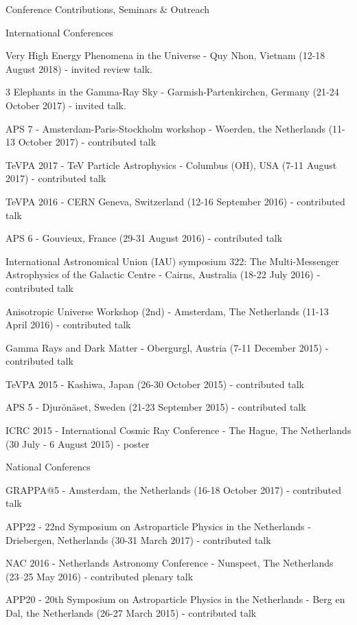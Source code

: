 \begin{rSection}{Conference Contributions, Seminars \& Outreach}
\begin{rSubsection}{International Conferences}{}{}{}
\vspace{-1.5em}
    \item Very High Energy Phenomena in the Universe - Quy Nhon, Vietnam (12-18 August 2018) - invited review talk.
    \item 3 Elephants in the Gamma-Ray Sky - Garmish-Partenkirchen, Germany (21-24 October 2017) - invited talk.
    \item APS 7 - Amsterdam-Paris-Stockholm workshop - Woerden, the Netherlands (11-13 October 2017) - contributed talk
    \item TeVPA 2017 - TeV Particle Astrophysics - Columbus (OH), USA (7-11 August 2017) - contributed talk
    \item TeVPA 2016 - CERN Geneva, Switzerland (12-16 September 2016) - contributed talk
    \item APS 6 - Gouvieux, France (29-31 August 2016) - contributed talk
    \item International Astronomical Union (IAU) symposium 322: The Multi-Messenger Astrophysics of the Galactic Centre - Cairns, Australia (18-22 July 2016) - contributed talk
    \item Anisotropic Universe Workshop (2nd) - Amsterdam, The Netherlands (11-13 April 2016) - contributed talk
    \item Gamma Rays and Dark Matter - Obergurgl, Austria (7-11 December 2015) - contributed talk
    \item TeVPA 2015 - Kashiwa, Japan (26-30 October 2015) - contributed talk
    \item APS 5 - Djur\"{o}n\"{a}set, Sweden (21-23 September 2015) - contributed talk
    \item ICRC 2015 - International Cosmic Ray Conference - The Hague, The Netherlands (30 July - 6 August 2015) - poster
\end{rSubsection}

\begin{rSubsection}{National Conferencs}{}{}{}
\vspace{-1.5em}
    \item GRAPPA@5 - Amsterdam, the Netherlands (16-18 October 2017) - contributed talk
    \item APP22 - 22nd Symposium on Astroparticle Physics in the Netherlands - Driebergen, Netherlands (30-31 March 2017) - contributed talk
    \item NAC 2016 - Netherlands Astronomy Conference - Nunspeet, The Netherlands (23–25 May 2016) - contributed plenary talk
    \item APP20 - 20th Symposium on Astroparticle Physics in the Netherlands - Berg en Dal, the Netherlands (26-27 March 2015) - contributed talk
\end{rSubsection}


\end{rSection}
